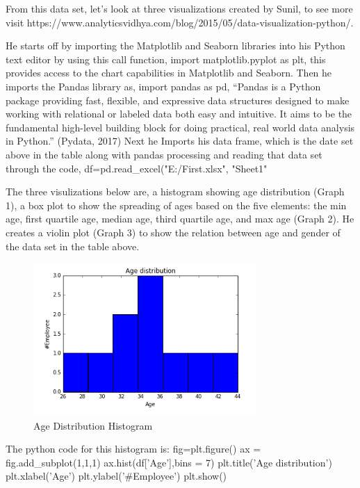 \documentclass[sigconf]{acmart}
\begin{document}
From this data set, let’s look at three visualizations created by Sunil, to see more visit https://www.analyticsvidhya.com/blog/2015/05/data-visualization-python/.  

He starts off by importing the Matplotlib and Seaborn libraries into his Python text editor by using this call function, import matplotlib.pyplot as plt, this provides access to the chart capabilities in Matplotlib and Seaborn.
Then he imports the Pandas library as, import pandas as pd, “Pandas is a Python package providing fast, flexible, and expressive data structures designed to make working with relational or labeled data both easy and intuitive. It aims to be the fundamental high-level building block for doing practical, real world data analysis in Python.” (Pydata, 2017) 
Next he Imports his data frame, which is the date set above in the table along with pandas processing and reading that data set through the code, df=pd.read_excel("E:/First.xlsx", "Sheet1"

The three visulizations below are, a histogram showing age distribution (Graph 1), a box plot to show the spreading of ages based on the five elements: the min age, first quartile age, median age, third quartile age, and max age (Graph 2). He creates a violin plot (Graph 3) to show the relation between age and gender of the data set in the table above.

\begin{figure}[htb]
  \centering
  \includegraphics[width=1.0\columnwidth]{paper2/Graph 1.png}
  \caption{Age Distribution Histogram
  \cite{Sunil Ray }}
  \label{fig:Graph 1} 
\end{figure}

The python code for this histogram is:
fig=plt.figure() 
ax = fig.add_subplot(1,1,1)
ax.hist(df['Age'],bins = 7) 
plt.title('Age distribution')
plt.xlabel('Age')
plt.ylabel('#Employee')
plt.show()
\end{document}

